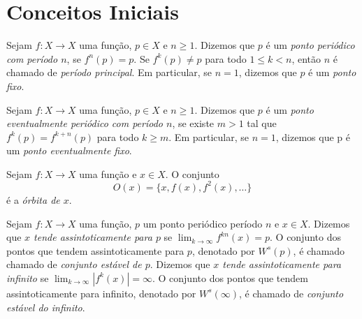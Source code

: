 \section{Conceitos Iniciais}

 
\begin{definition}
Sejam $f: X \to X$ uma função, $p \in X$ e $n \geq 1$.  Dizemos que $p$ é um \textit{ponto periódico com período $n$}, se $f^n(p) = p$. Se $f^k(p) \neq p$ para todo $1 \leq k < n$, então $n$ é chamado de \textit{período principal}. Em particular, se $n=1$, dizemos que $p$ é um \textit{ponto fixo}.%
\end{definition}

\begin{definition}
Sejam $f: X \to X$ uma função, $p \in X$ e $n \geq 1$. Dizemos que $p$ é um \textit{ponto eventualmente periódico com período $n$}, se existe $m > 1$ tal que $f^k(p) = f^{k+n}(p)$ para todo $k \geq m$. Em particular, se $n = 1$, dizemos que p é um \textit{ponto eventualmente fixo}.
\end{definition}

\begin{definition}
Sejam $f:X \to X$ uma função e $x \in X$. O conjunto $$O(x) = \lbrace x, f(x), f^2(x), \dots \rbrace$$ é a \textit{órbita de $x$}.
\end{definition}

\begin{definition}
Sejam $f: X \to X$ uma função, $p$ um ponto periódico período $n$ e $x \in X$. Dizemos que \textit{$x$ tende assintoticamente para $p$} se $\lim_{k \to \infty} f^{kn}(x) = p$. O conjunto dos pontos que tendem assintoticamente para $p$, denotado por $W^s(p)$, é chamado chamado de \textit{conjunto estável de $p$}. Dizemos que \textit{$x$ tende assintoticamente para infinito} se $\lim_{k \to \infty} |f^{k}(x)| = \infty$. O conjunto dos pontos que tendem assintoticamente para infinito, denotado por $W^s(\infty)$, é chamado de \textit{conjunto estável do infinito}.
\end{definition}

